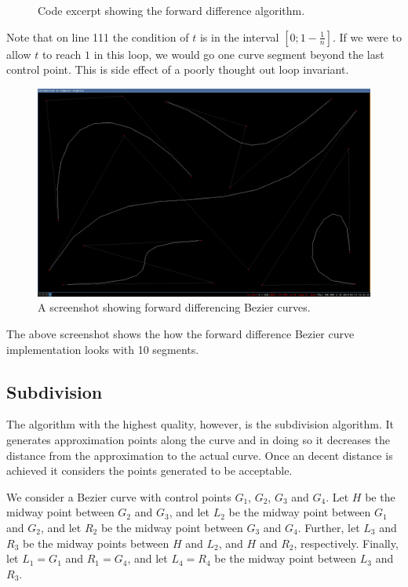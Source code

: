 \documentclass[11pt]{article}
\newcommand{\codefig}[5]
{
\begin{figure}[H]
    
    \caption{#5}
    \label{code:#1}
\end{figure}
}
\begin{document}
\codefig{forward-diff}{BezierVec4.cpp}{95}{125}
{Code excerpt showing the forward difference algorithm.}

Note that on line 111 the condition of $t$ is in the interval
$[0; 1 - \frac{1}{n}]$. If we were to allow $t$ to reach $1$ in this loop, we
would go one curve segment beyond the last control point. This is side effect
of a poorly thought out loop invariant.

\begin{figure}[H]
    \center
    \includegraphics[scale=0.25]{figures/test-forward-diff.png}
    \caption{A screenshot showing forward differencing Bezier curves.}
    \label{fig:test-forward-diff}
\end{figure}

The above screenshot shows the how the forward difference Bezier curve
implementation looks with 10 segments.

\subsection{Subdivision}
The algorithm with the highest quality, however, is the subdivision algorithm.
It generates approximation points along the curve and in doing so it decreases
the distance from the approximation to the actual curve. Once an decent
distance is achieved it considers the points generated to be acceptable.

We consider a Bezier curve with control points $G_1$, $G_2$, $G_3$ and $G_4$.
Let $H$ be the midway point between $G_2$ and $G_3$, and let $L_2$ be the
midway point between $G_1$ and $G_2$, and let $R_2$ be the midway point
between $G_3$ and $G_4$. Further, let $L_3$ and $R_3$ be the midway points
between $H$ and $L_2$, and $H$ and $R_2$, respectively. Finally, let $L_1 =
G_1$ and $R_1 = G_4$, and let $L_4 = R_4$ be the midway point between $L_3$
and $R_3$.
\end{document}
